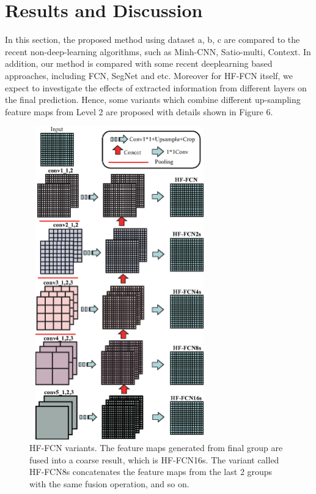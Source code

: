 \section{Results and Discussion}
\label{Sec:Res}
In this section, the proposed method using dataset a, b, c are compared to the recent non-deep-learning algorithms, such as Minh-CNN\cite{IEEEexample:mnih2013machine}, Satio-multi\cite{IEEEexample:saito2016multiple}, Context\cite{IEEEexample:audebert2017deep}. In addition, our method is compared with some recent deeplearning based approaches, including FCN\cite{IEEEexample:Long_2015_CVPR}, SegNet\cite{IEEEexample:badrinarayanan2017segnet} and etc. Moreover for HF-FCN itself, we expect to investigate the effects of extracted information from different layers on the final prediction. Hence, some variants which combine different up-sampling feature maps from Level 2 are proposed with details shown in Figure 6.\par

\begin{figure}[t]
\begin{center}
\includegraphics[width=7.8cm,height = 13.5cm]{Figures/HF-FCN_vairants.eps}
\caption{HF-FCN variants. The feature maps generated from final group are fused into a coarse result, which is HF-FCN16s. The variant called HF-FCN8s concatenates the feature maps from the last 2 groups with the same fusion operation, and so on.}
\label{6}
\end{center}
\end{figure}

